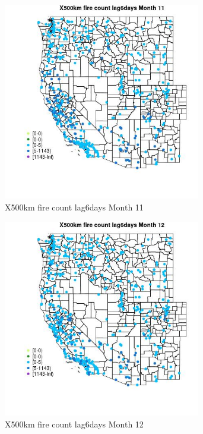 \begin{figure} 
\centering  
\includegraphics[width=0.77\textwidth]{Code_Outputs/Report_ML_input_PM25_Step4_part_e_de_duplicated_aves_compiled_2019-05-14wNAs_MapObsMo11X500km_fire_count_lag6days.jpg} 
\caption{\label{fig:Report_ML_input_PM25_Step4_part_e_de_duplicated_aves_compiled_2019-05-14wNAsMapObsMo11X500km_fire_count_lag6days}X500km fire count lag6days Month 11} 
\end{figure} 
 

\clearpage 

\begin{figure} 
\centering  
\includegraphics[width=0.77\textwidth]{Code_Outputs/Report_ML_input_PM25_Step4_part_e_de_duplicated_aves_compiled_2019-05-14wNAs_MapObsMo12X500km_fire_count_lag6days.jpg} 
\caption{\label{fig:Report_ML_input_PM25_Step4_part_e_de_duplicated_aves_compiled_2019-05-14wNAsMapObsMo12X500km_fire_count_lag6days}X500km fire count lag6days Month 12} 
\end{figure} 
 

